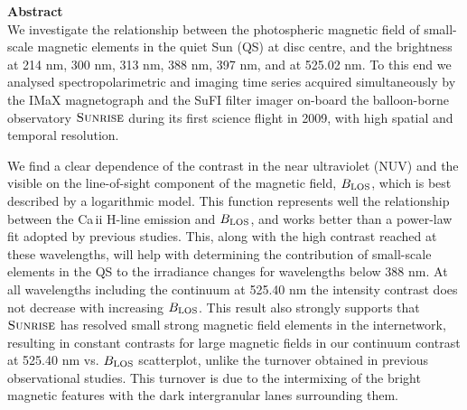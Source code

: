 \documentclass[goettingen, gauss, print]{thesis}
\begin{document}
\textbf{Abstract} \\
We investigate the relationship between the photospheric magnetic field of small-scale magnetic elements in the quiet Sun (QS) at disc centre, and the brightness at 214 nm, 300 nm, 313 nm, 388 nm, 397 nm, and at 525.02 nm. To this end we analysed spectropolarimetric and imaging time series acquired simultaneously by the IMaX magnetograph and the SuFI filter imager on-board the balloon-borne observatory $\textsc{Sunrise}$ during its first science flight in 2009, with high spatial and temporal resolution.

We find a clear dependence of the contrast in the near ultraviolet (NUV) and the visible on the line-of-sight component of the magnetic field, $B_{\rm LOS}$, which is best described by a logarithmic model. This function represents well the relationship between the Ca\,{\sc ii} H-line emission and $B_{\rm LOS}$, and works better than a power-law fit adopted by previous studies. This, along with the high contrast reached at these wavelengths, will help with determining the contribution of small-scale elements in the QS to the irradiance changes for wavelengths below 388 nm. At all wavelengths including the continuum at 525.40 nm the intensity contrast does not decrease with increasing $B_{\rm LOS}$. This result also strongly supports that $\textsc{Sunrise}$ has resolved small strong magnetic field elements in the internetwork, resulting in constant contrasts for large magnetic fields in our continuum contrast at 525.40 nm vs. $B_{\rm LOS}$  scatterplot, unlike the turnover obtained in previous observational studies. This turnover is due to the intermixing of the bright magnetic features with the dark intergranular lanes surrounding them. 
\clearpage
\end{document}
